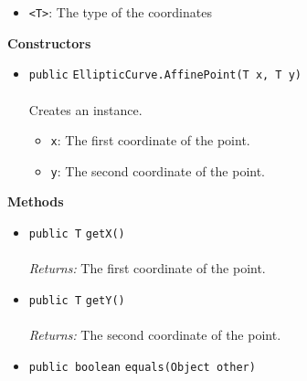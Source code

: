 \begin{itemize}
\item \lstinline|<T>|: The type of the coordinates
\end{itemize}



\textbf{\sffamily Constructors}
\begin{itemize}
\item \lstinline|public| \lstinline|EllipticCurve.AffinePoint|\lstinline|(T x, T y)|\\ \\[-0.6em]
Creates an instance.
\begin{itemize}
\item \lstinline|x|: The first coordinate of the point.
\item \lstinline|y|: The second coordinate of the point.
\end{itemize}



\end{itemize}


\textbf{\sffamily Methods}
\begin{itemize}
\item \lstinline|public T| \lstinline|getX|\lstinline|()|\\ \\[-0.6em]
\emph{Returns:} The first coordinate of the point.



\item \lstinline|public T| \lstinline|getY|\lstinline|()|\\ \\[-0.6em]
\emph{Returns:} The second coordinate of the point.



\item \lstinline|public boolean| \lstinline|equals|\lstinline|(Object other)| \\[-0.6em]




\end{itemize}

